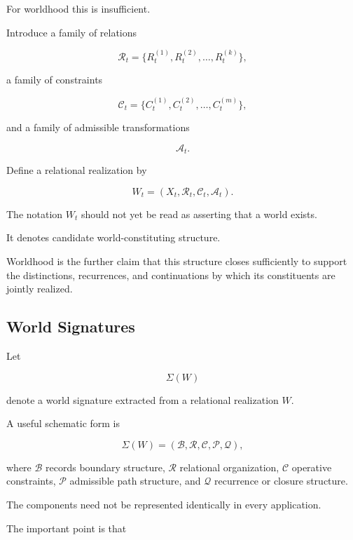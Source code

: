 \documentclass[
  11pt,
  a4paper,
  DIV=12,
  BCOR=0mm,
  parskip=half-
]{scrartcl}
\theoremstyle{definition}
\theoremstyle{plain}
\theoremstyle{remark}
\begin{document}
For worldhood this is insufficient.

Introduce a family of relations

\[
  \mathcal R_t
  =
  \{
    R_t^{(1)},
    R_t^{(2)},
    \ldots,
    R_t^{(k)}
  \},
\]

a family of constraints

\[
  \mathcal C_t
  =
  \{
    C_t^{(1)},
    C_t^{(2)},
    \ldots,
    C_t^{(m)}
  \},
\]

and a family of admissible transformations

\[
  \mathcal A_t.
\]

Define a relational realization by

\[
  W_t
  =
  \left(
    X_t,
    \mathcal R_t,
    \mathcal C_t,
    \mathcal A_t
  \right).
\]

The notation \(W_t\) should not yet be read as asserting that a world exists.

It denotes candidate world-constituting structure.

Worldhood is the further claim that this structure closes sufficiently to
support the distinctions, recurrences, and continuations by which its
constituents are jointly realized.


\subsection{World Signatures}
\label{app:world-signatures}

Let

\[
  \Sigma(W)
\]

denote a world signature extracted from a relational realization \(W\).

A useful schematic form is

\[
  \Sigma(W)
  =
  \left(
    \mathcal B,
    \mathcal R,
    \mathcal C,
    \mathcal P,
    \mathcal Q
  \right),
\]

where \(\mathcal B\) records boundary structure, \(\mathcal R\) relational
organization, \(\mathcal C\) operative constraints, \(\mathcal P\) admissible
path structure, and \(\mathcal Q\) recurrence or closure structure.

The components need not be represented identically in every application.

The important point is that
\end{document}
